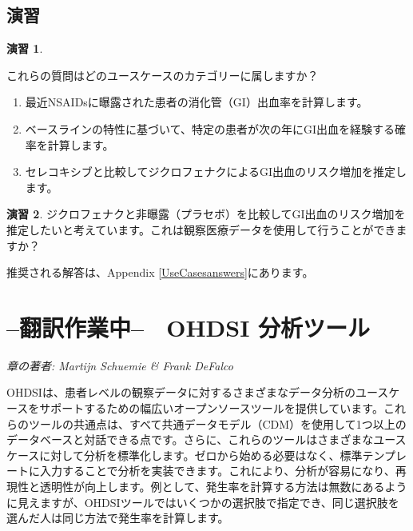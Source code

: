 \documentclass[
  11pt]{book}
\theoremstyle{definition}
\theoremstyle{definition}
\theoremstyle{definition}
\newtheorem{exercise}{演習}[chapter]
\theoremstyle{definition}
\theoremstyle{remark}
\begin{document}
\section{演習}\label{ux6f14ux7fd2-3}

\begin{exercise}
\protect\hypertarget{exr:exerciseUseCases1}{}\label{exr:exerciseUseCases1}

これらの質問はどのユースケースのカテゴリーに属しますか？

\begin{enumerate}
\def\labelenumi{\arabic{enumi}.}
\item
  最近NSAIDsに曝露された患者の消化管（GI）出血率を計算します。
\item
  ベースラインの特性に基づいて、特定の患者が次の年にGI出血を経験する確率を計算します。
\item
  セレコキシブと比較してジクロフェナクによるGI出血のリスク増加を推定します。
\end{enumerate}

\end{exercise}

\begin{exercise}
\protect\hypertarget{exr:exerciseUseCases2}{}\label{exr:exerciseUseCases2}ジクロフェナクと非曝露（プラセボ）を比較してGI出血のリスク増加を推定したいと考えています。これは観察医療データを使用して行うことができますか？
\end{exercise}

推奨される解答は、Appendix \ref{UseCasesanswers}にあります。

\chapter{--翻訳作業中--　OHDSI 分析ツール}\label{OhdsiAnalyticsTools}

\emph{章の著者: Martijn Schuemie \& Frank DeFalco}

OHDSIは、患者レベルの観察データに対するさまざまなデータ分析のユースケースをサポートするための幅広いオープンソースツールを提供しています。これらのツールの共通点は、すべて共通データモデル（CDM）を使用して1つ以上のデータベースと対話できる点です。さらに、これらのツールはさまざまなユースケースに対して分析を標準化します。ゼロから始める必要はなく、標準テンプレートに入力することで分析を実装できます。これにより、分析が容易になり、再現性と透明性が向上します。例として、発生率を計算する方法は無数にあるように見えますが、OHDSIツールではいくつかの選択肢で指定でき、同じ選択肢を選んだ人は同じ方法で発生率を計算します。
\end{document}
